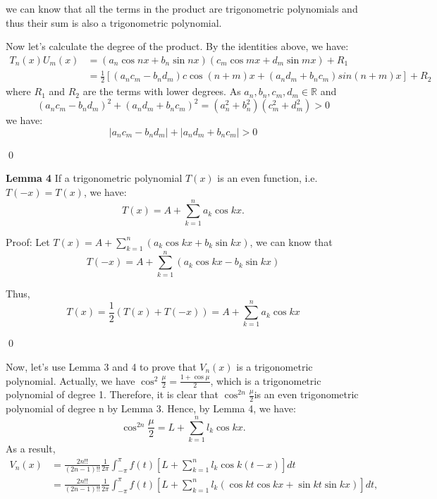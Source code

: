 \documentclass[12pt]{article}
\begin{document}
we can know that all the terms in the product are trigonometric polynomials and thus their sum is also a trigonometric polynomial.
\par Now let's calculate the degree of the product. By the identities above, we have:
\[
\begin{split}
T_n(x)U_m(x)&=(a_n\cos{nx}+b_n\sin{nx})(c_m\cos{mx}+d_m\sin{mx})+R_1\\
&=\frac{1}{2}[(a_nc_m-b_nd_m)c\cos{(n+m)x}+(a_nd_m+b_nc_m)sin(n+m)x]+R_2
\end{split}
\]
where $R_1$ and $R_2$ are the terms with lower degrees. As $a_n, b_n, c_m, d_m \in \mathbb{R}$ and
\begin{equation*}
(a_nc_m-b_nd_m)^2+(a_nd_m+b_nc_m)^2=(a_n^2+b_n^2)(c_m^2+d_m^2)>0
\end{equation*}
we have:
\begin{equation*}
|a_nc_m-b_nd_m|+|a_nd_m+b_nc_m|>0
\end{equation*}
\par \qed
\par {\textbf{Lemma 4}} If a trigonometric polynomial $T(x)$ is an even function, i.e. $T(-x)=T(x)$, we have:
\begin{equation*}
T(x)=A+\sum_{k=1}^{n}a_k\cos{kx}.
\end{equation*}
\par Proof: Let $T(x)=A+\sum\limits_{k=1}^{n}(a_k\cos{kx}+b_k\sin{kx})$, we can know that
\begin{equation*}
T(-x)=A+\sum_{k=1}^{n}(a_k\cos{kx}-b_k\sin{kx})
\end{equation*}
\par Thus,
\begin{equation*}
T(x)=\frac{1}{2}(T(x)+T(-x))=A+\sum_{k=1}^{n}a_k\cos{kx}
\end{equation*}
\par \qed
\par Now, let's use Lemma 3 and 4 to prove that $V_n(x)$ is a trigonometric polynomial. Actually, we have $\cos^2{\frac{\mu}{2}}=\frac{1+\cos{\mu}}{2}$, which is a trigonometric polynomial of degree 1. Therefore, it is clear that $\cos^{2n}{\frac{\mu}{2}}$is an even trigonometric polynomial of degree n by Lemma 3. Hence, by Lemma 4, we have:
\begin{equation*}
\cos^{2n}{\frac{\mu}{2}}=L+\sum_{k=1}^{n}l_k\cos{kx}.
\end{equation*}
As a result, 
\[
\begin{split}
V_n(x)&=\frac{2n!!}{(2n-1)!!}\frac{1}{2\pi}\int_{-\pi}^{\pi}f(t)[L+\sum_{k=1}^{n}l_k\cos{k(t-x)}]dt\\
&=\frac{2n!!}{(2n-1)!!}\frac{1}{2\pi}\int_{-\pi}^{\pi}f(t)[L+\sum_{k=1}^{n}l_k(\cos{kt}\cos{kx}+\sin{kt}\sin{kx})]dt,
\end{split}
\]
\end{document}

